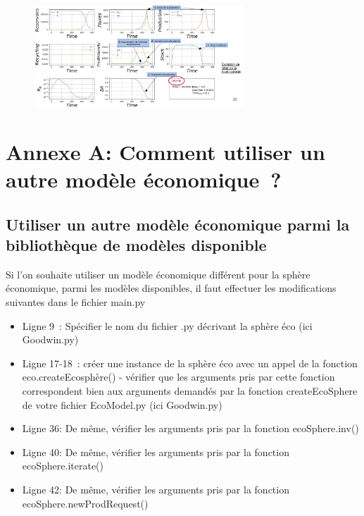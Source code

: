 \documentclass[12pt,a4paper]{article}%
\begin{document}
\begin{figure}[h]
\centering\includegraphics[width=0.7\textwidth]{figures/ResultatSimulPet.jpg}
\end{figure}

\newpage

\section{Annexe A: Comment utiliser un autre modèle économique~?}

\subsection{Utiliser un autre modèle économique parmi la bibliothèque
de modèles disponible}

Si l'on souhaite utiliser un modèle économique différent pour la
sphère économique, parmi les modèles disponibles, il faut effectuer
les modifications suivantes dans le fichier main.py

\begin{itemize}
\item Ligne 9~: Spécifier le nom du fichier .py décrivant la sphère éco
(ici Goodwin.py)

\item Ligne 17-18~: créer une instance de la sphère éco avec un appel de
la fonction eco.createEcosphère() - vérifier que les arguments pris par
cette fonction correspondent bien aux arguments demandés par la fonction
createEcoSphere de votre fichier EcoModel.py (ici Goodwin.py)

\item Ligne 36: De même, vérifier les arguments pris par la fonction ecoSphere.inv()

\item Ligne 40: De même, vérifier les arguments pris par la fonction ecoSphere.iterate()

\item Ligne 42: De même, vérifier les arguments pris par la fonction ecoSphere.newProdRequest()
\end{itemize}
\end{document}
